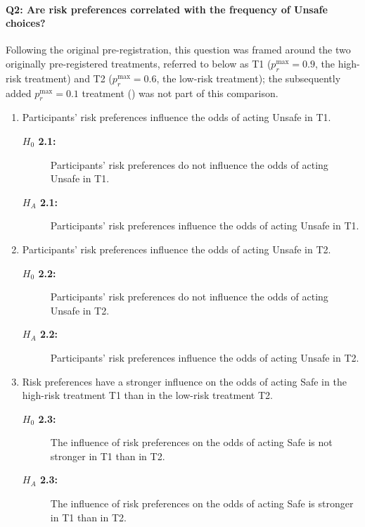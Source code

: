 \documentclass[pdflatex,sn-mathphys-ay]{sn-jnl}
\theoremstyle{thmstyleone}
\theoremstyle{thmstyletwo}
\theoremstyle{thmstylethree}
\begin{document}
\paragraph{Q2: Are risk preferences correlated with the frequency of Unsafe choices?}

Following the original pre-registration, this question was framed around the two originally pre-registered treatments, referred to below as T1 (\(p_r^{\max}=0.9\), the high-risk treatment) and T2 (\(p_r^{\max}=0.6\), the low-risk treatment); the subsequently added \(p_r^{\max}=0.1\) treatment () was not part of this comparison.

\begin{enumerate}[label={Hypothesis 2.\arabic*:}, labelwidth={90pt}, leftmargin=*]
    \item Participants' risk preferences influence the odds of acting Unsafe in T1.
    \begin{description}
        \item[\textbf{\(H_0\) 2.1:}] Participants' risk preferences do not influence the odds of acting Unsafe in T1.
        \item[\textbf{\(H_A\) 2.1:}] Participants' risk preferences influence the odds of acting Unsafe in T1.
    \end{description}

    \item Participants' risk preferences influence the odds of acting Unsafe in T2.
    \begin{description}
        \item[\textbf{\(H_0\) 2.2:}] Participants' risk preferences do not influence the odds of acting Unsafe in T2.
        \item[\textbf{\(H_A\) 2.2:}] Participants' risk preferences influence the odds of acting Unsafe in T2.
    \end{description}

    \item Risk preferences have a stronger influence on the odds of acting Safe in the high-risk treatment T1 than in the low-risk treatment T2.
    \begin{description}
        \item[\textbf{\(H_0\) 2.3:}] The influence of risk preferences on the odds of acting Safe is not stronger in T1 than in T2.
        \item[\textbf{\(H_A\) 2.3:}] The influence of risk preferences on the odds of acting Safe is stronger in T1 than in T2.
    \end{description}
\end{enumerate}
\end{document}
